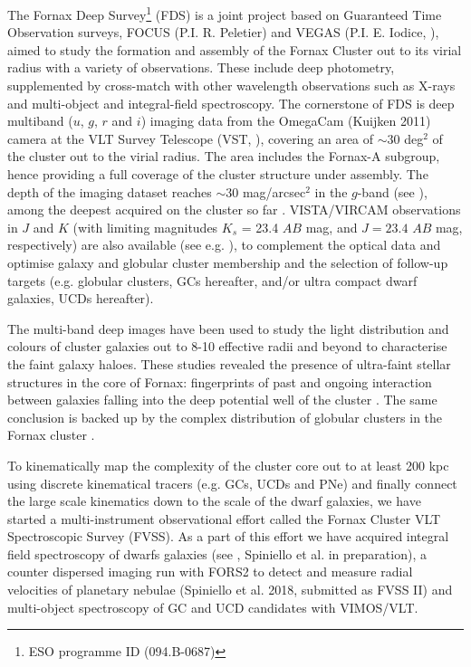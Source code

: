 \documentclass[useAMS,usenatbib]{mn2e}
\begin{document}
The Fornax Deep Survey\footnote{ESO programme ID (094.B-0687)} (FDS) is a joint 
project based on Guaranteed Time Observation surveys, FOCUS (P.I. R. Peletier) 
and VEGAS (P.I. E. Iodice, \citealt{capaccioli+15}), aimed to study the 
formation and assembly of the Fornax Cluster out to its virial radius with a 
variety of observations. These include
deep photometry, supplemented by cross-match with other wavelength observations 
such as  X-rays \citep[][e.g.,]{Paolillo02} and multi-object and integral-field 
spectroscopy.
The cornerstone of FDS is deep multiband ($u$, $g$, $r$ and $i$) imaging data 
from the OmegaCam (Kuijken 2011) camera at the VLT Survey Telescope (VST, 
\citealt{schipani+12}), covering an area of $\sim30$ deg$^2$ of the cluster out 
to the virial radius. The area includes the Fornax-A subgroup, hence providing 
a full coverage of the cluster structure under assembly.  The depth of the 
imaging dataset reaches $\sim 30$ mag/arcsec$^2$ in the $g$-band (see \citealt{Iodice16,iodice17}
), among the deepest acquired on the cluster so far \citep{venhola+17}. 
VISTA/VIRCAM observations in $J$ and $K$ (with limiting magnitudes $K_s$ = 23.4 $AB$ mag, and 
$J = 23.4$ $AB$ mag, respectively) are also available (see e.g. \citealt{munoz+15}), to 
complement the optical data and optimise galaxy and globular cluster membership 
and the selection of follow-up targets (e.g. globular clusters, GCs hereafter, 
and/or ultra compact dwarf galaxies, UCDs hereafter). 

The multi-band deep images have been used to study the light distribution and 
colours of cluster galaxies out to 8-10 effective radii and beyond to 
characterise the faint galaxy haloes. These studies revealed the presence of 
ultra-faint stellar structures in the core of Fornax: fingerprints of past and 
ongoing interaction between galaxies falling into the deep potential well of 
the cluster \citep{Iodice16,venhola+17}. The same conclusion is 
backed up by the complex distribution of globular clusters in the Fornax 
cluster \citep{DAbrusco16,cantiello+17}.

To kinematically map the complexity of the cluster core out to at least 200 kpc 
using discrete kinematical tracers (e.g. GCs, UCDs and PNe) and finally connect the 
large scale kinematics down to the scale of the dwarf galaxies, we have started 
a multi-instrument observational effort called the Fornax Cluster VLT 
Spectroscopic Survey (FVSS). As a part of this effort we have acquired integral 
field spectroscopy of dwarfs galaxies (see \citealt{mentz+16}, Spiniello et al. 
in preparation), a counter dispersed imaging run with FORS2 to detect and 
measure radial velocities of planetary nebulae (Spiniello et al. 2018, 
submitted as FVSS II) and multi-object spectroscopy of GC and UCD candidates 
with VIMOS/VLT.
\end{document}
